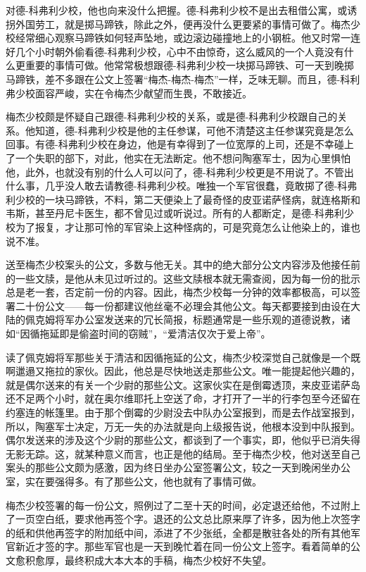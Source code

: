     对德-科弗利少校，他也向来没什么把握。德-科弗利少校不是出去租借公寓，或诱拐外国劳工，就是掷马蹄铁，除此之外，便再没什么更要紧的事情可做了。梅杰少校经常细心观察马蹄铁如何轻声坠地，或边滚边碰撞地上的小钢桩。他又时常一连好几个小时朝外偷看德-科弗利少校，心中不由惊奇，这么威风的一个人竟没有什么更重要的事情可做。他常常极想跟德-科弗利少校一块掷马蹄铁、可一天到晚掷马蹄铁，差不多跟在公文上签署“梅杰-梅杰-梅杰”一样，乏味无聊。而且，德-科利弗少校面容严峻，实在令梅杰少献望而生畏，不敢接近。

    梅杰少校颇是怀疑自己跟德-科弗利少校的关系，或是德-科弗利少校跟自己的关系。他知道，德-科弗利少校是他的主任参谋，可他不清楚这主任参谋究竟是怎么回事。有德-科弗利少校在身边，他是有幸得到了一位宽厚的上司，还是不幸碰上了一个失职的部下，对此，他实在无法断定。他不想问陶塞军士，因为心里惧怕他，此外，也就没有别的什么人可以问了，德-科弗利少校更是不用说了。不管出什么事，几乎没人敢去请教德-科弗利少校。唯独一个军官很蠢，竟敢掷了德-科弗利少校的一块马蹄铁，不料，第二天便染上了最奇怪的皮亚诺萨怪病，就连格斯和韦斯，甚至丹尼卡医生，都不曾见过或听说过。所有的人都断定，是德-科弗利少校为了报复，才让那可怜的军官染上这种怪病的，可是究竟怎么让他染上的，谁也说不准。

    送至梅杰少校案头的公文，多数与他无关。其中的绝大部分公文内容涉及他接任前的一些文牍，是他从未见过听过的。这些文牍根本就无需查阅，因为每一份的批示总是老一套，否定前一份的内容。因此，梅杰少校每一分钟的效率都极高，可以签署二十份公文——每一份都建议他丝毫不必理会其他公文。每天都要接到由设在大陆的佩克姆将军办公室发送来的冗长简报，标题通常是一些乐观的道德说教，诸如“因循拖延即是偷盗时间的窃贼”，“爱清洁仅次于爱上帝”。

    读了佩克姆将军那些关于清洁和因循拖延的公文，梅杰少校深觉自己就像是一个既啊邋遢又拖拉的家伙。因此，他总是尽快地送走那些公文。唯一能提起他兴趣的，就是偶尔送来的有关一个少尉的那些公文。这家伙实在是倒霉透顶，来皮亚诺萨岛还不足两个小时，就在奥尔维耶托上空送了命，才打开了一半的行李包至今还留在约塞连的帐篷里。由于那个倒霉的少尉没去中队办公室报到，而是去作战室报到，所以，陶塞军士决定，万无一失的办法就是向上级报告说，他根本没到中队报到。偶尔发送来的涉及这个少尉的那些公文，都谈到了一个事实，即，他似乎已消失得无影无踪。这，就某种意义而言，也正是他的结局。至于梅杰少校，他对送至自己案头的那些公文颇为感激，因为终日坐办公室签署公文，较之一天到晚闲坐办公室，实在要强得多。有了那些公文，他也就有了事情可做。

    梅杰少校签署的每一份公文，照例过了二至十天的时间，必定退还给他，不过附上了一页空白纸，要求他再签个字。退还的公文总比原来厚了许多，因为他上次签字的纸和供他再签字的附加纸中间，添进了不少张纸，全都是散驻各处的所有其他军官新近才签的字。那些军官也是一天到晚忙着在同一份公文上签字。看着简单的公文愈积愈厚，最终积成大本大本的手稿，梅杰少校好不失望。

